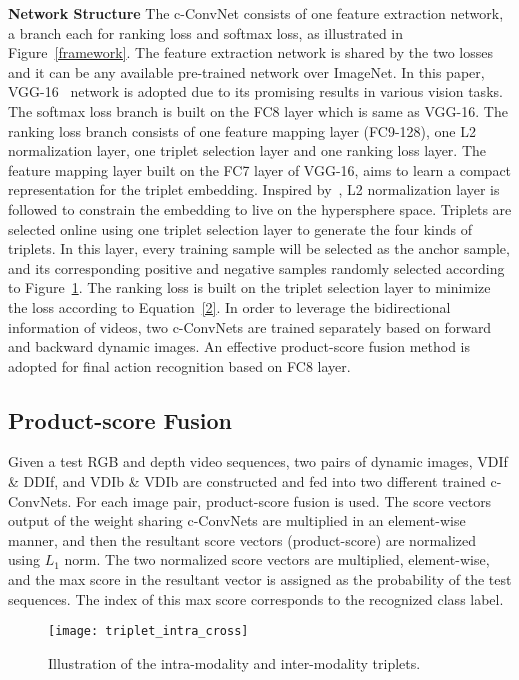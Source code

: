 \documentclass[letterpaper]{article} %
\begin{document}
\textbf{Network Structure}
The c-ConvNet consists of one feature extraction network, a branch each for
ranking loss and softmax loss, as illustrated in
Figure~\ref{framework}.
The feature extraction network is shared by the two losses and it can be any
available pre-trained network over ImageNet. In this paper,
VGG-16~\cite{simonyan2014very} network is adopted due to its promising results
in various vision tasks. The softmax loss branch is built on the FC8 layer which
is same as VGG-16. The ranking loss branch consists of one feature mapping
layer (FC9-128), one L2 normalization layer, one triplet selection layer and one
ranking loss layer. The feature mapping layer built on the FC7 layer of
VGG-16, aims to learn a compact representation for the triplet embedding.
Inspired by~\cite{schroff2015facenet}, L2 normalization layer is followed to
constrain the embedding to live on the hypersphere space. Triplets are selected
online using one triplet selection layer to generate the four kinds of triplets.
In this layer, every training sample will be selected as the anchor sample, and
its corresponding positive and negative samples randomly selected according to
Figure~\ref{triplets}. The ranking loss is built on the triplet selection layer
to minimize the loss according to Equation~\ref{2}. In order to leverage the
bidirectional information of videos, two c-ConvNets are trained separately
based on forward and backward dynamic images. An effective product-score fusion
method is adopted for final action recognition based on FC8 layer.


\subsection{Product-score Fusion}
Given a test RGB and depth video sequences, two pairs of dynamic
images, VDIf \& DDIf, and VDIb \& VDIb are constructed and fed into two
different trained c-ConvNets. For each image pair, product-score fusion is
used. The score vectors output of the weight sharing c-ConvNets are
multiplied in an element-wise manner, and then the resultant score vectors
(product-score) are normalized using $L_{1}$ norm. The two normalized score
vectors are multiplied, element-wise, and the max score in the resultant vector
is assigned as the probability of the test sequences. The index of this max
score corresponds to the recognized class label.


\begin{figure}[t]
\begin{center}{\texttt{[image: triplet\_intra\_cross]}}
\end{center}
\caption{Illustration of the intra-modality and inter-modality triplets. }
\label{triplets}
\end{figure}
\end{document}
